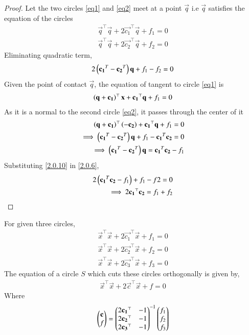 \documentclass[journal,12pt,twocolumn]{IEEEtran}
\begin{document}
\begin{proof}
Let the two circles \eqref{eq1} and \eqref{eq2} meet at a point $\vec{q}$ i.e $\vec{q}$ satisfies the equation of the circles
\begin{align}
    \vec{q}^\top\vec{q} + 2\vec{c_1}^\top\vec{q} + f_1 = 0 \label{2.0.4}\\
    \vec{q}^\top\vec{q} + 2\vec{c_2}^\top\vec{q} + f_2 = 0 \label{2.0.5}
\end{align}
Eliminating quadratic term,
\begin{align}
    2\left(\mathbf{c_1}^T - \mathbf{c_2}^T\right)\mathbf{q} + f_1 - f_2 = 0 \label{2.0.6}
\end{align}
Given the point of contact $\vec{q}$, the equation of tangent to circle \eqref{eq1} is
\begin{align}
    \left(\mathbf{q}+\mathbf{c_1}\right)^\top\mathbf{x} + \mathbf{c_1}^\top\mathbf{q} + f_1 = 0 
\end{align}
As it is a normal to the second circle \eqref{eq2}, it passes through the center of it
\begin{align}
    \left(\mathbf{q}+\mathbf{c_1}\right)^\top\left(\mathbf{-c_2}\right) + \mathbf{c_1}^\top\mathbf{q} + f_1 = 0 \\
    \implies \left(\mathbf{c_1}^T - \mathbf{c_2}^T\right)\mathbf{q} + f_1 - \mathbf{c_1}^T\mathbf{c_2} = 0 \\
    \implies \left(\mathbf{c_1}^T - \mathbf{c_2}^T\right)\mathbf{q} = \mathbf{c_1}^T\mathbf{c_2} - f_1
    \label{2.0.10}
\end{align}
Substituting \eqref{2.0.10} in \eqref{2.0.6},
\begin{align}
    2\left(\mathbf{c_1}^T\mathbf{c_2} - f_1\right)  + f_1 - f2 = 0 \\
    \implies 2\mathbf{c_1}^\top\mathbf{c_2} = f_1 + f_2 
\end{align}
\end{proof}
\begin{lemma}
For given three circles,
\begin{align}
    \vec{x}^\top\vec{x} + 2\vec{c_1}^\top\vec{x} + f_1 = 0 \label{S1=0}\\
    \vec{x}^\top\vec{x} + 2\vec{c_2}^\top\vec{x} + f_2 = 0 \label{S2=0}\\
    \vec{x}^\top\vec{x} + 2\vec{c_3}^\top\vec{x} + f_3 = 0 \label{S3=0}
\end{align}
The equation of a circle $S$ which cuts these circles orthogonally is given by,
\begin{align}
    \vec{x}^\top\vec{x} + 2\vec{c}^\top\vec{x} + f = 0 \label{S=0}
\end{align}
Where 
\begin{align}
    \begin{pmatrix}\mathbf{c}\\f\end{pmatrix} = \begin{pmatrix}2\mathbf{c_1}^\top&-1\\2\mathbf{c_2}^\top&-1\\2\mathbf{c_3}^\top&-1\end{pmatrix}^{-1}\begin{pmatrix}f_1\\f_2\\f_3\end{pmatrix}
\end{align}
\end{lemma}\label{lemma2}
\end{document}

